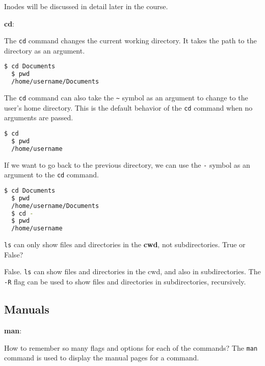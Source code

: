 Inodes will be discussed in detail later in the course.

\textbf{cd}:

The \texttt{cd} command changes the current working directory. It takes the path to the directory as an argument.

\begin{lstlisting}[language=bash]
  $ cd Documents
  $ pwd
  /home/username/Documents
\end{lstlisting}

The \texttt{cd} command can also take the \texttt{\textasciitilde} symbol as an argument to change to the user's home directory.
This is the default behavior of the \texttt{cd} command when no arguments are passed.

\begin{lstlisting}[language=bash]
  $ cd
  $ pwd
  /home/username
\end{lstlisting}

If we want to go back to the previous directory, we can use the \texttt{-} symbol as an argument to the \texttt{cd} command.

\begin{lstlisting}[language=bash]
  $ cd Documents
  $ pwd
  /home/username/Documents
  $ cd -
  $ pwd
  /home/username
\end{lstlisting}


\begin{qs}
  \texttt{ls} can only show files and directories in the \textbf{cwd}, not subdirectories.
  True or False?
\end{qs}

\begin{ans}
  False. \texttt{ls} can show files and directories in the cwd, and also in subdirectories.
  The \texttt{-R} flag can be used to show files and directories in subdirectories, recursively.
\end{ans}


\subsection{Manuals}

\textbf{man}:

How to remember so many flags and options for each of the commands?
The \texttt{man} command is used to display the manual pages for a command.

